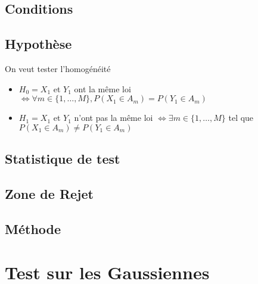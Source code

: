 \documentclass{article}
\theoremstyle{plain}%
\theoremstyle{definition}
\theoremstyle{remark}
\begin{document}
\subsection*{Conditions}
\subsection*{Hypothèse}
On veut tester l'homogénéité \begin{itemize}
    \item $ H_0 = X_1$ et $ Y_1 $  ont la même loi $ \Leftrightarrow \forall m \in \{1,\dots,M \}, P(X_1 \in A_m) = P(Y_1 \in A_m) $ 
    \item $ H_1 = X_1$ et $ Y_1 $  n'ont pas la même loi $ \Leftrightarrow \exists m \in \{1, \dots, M\} $ tel que $ P(X_1 \in A_m) \neq P(Y_1 \in A_m) $ 
\end{itemize}
\subsection*{Statistique de test}
\subsection*{Zone de Rejet}
\subsection*{Méthode}

\section{Test sur les Gaussiennes}
\end{document}

